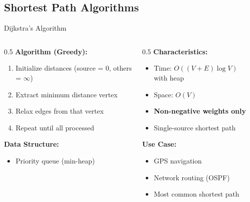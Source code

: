 \documentclass[aspectratio=169,xcolor=dvipsnames]{beamer}
\begin{document}
\subsection{Shortest Path Algorithms}

\begin{frame}{Dijkstra's Algorithm}
  \begin{columns}
    \begin{column}{0.5\textwidth}
      \textbf{Algorithm (Greedy):}
      \begin{enumerate}
        \item Initialize distances (source = 0, others = $\infty$)
        \item Extract minimum distance vertex
        \item Relax edges from that vertex
        \item Repeat until all processed
      \end{enumerate}

      \vspace{0.3cm}
      \textbf{Data Structure:}
      \begin{itemize}
        \item Priority queue (min-heap)
      \end{itemize}
    \end{column}

    \begin{column}{0.5\textwidth}
      \textbf{Characteristics:}
      \begin{itemize}
        \item Time: $O((V + E) \log V)$ with heap
        \item Space: $O(V)$
        \item \textbf{Non-negative weights only}
        \item Single-source shortest path
      \end{itemize}

      \vspace{0.3cm}
      \textbf{Use Case:}
      \begin{itemize}
        \item GPS navigation
        \item Network routing (OSPF)
        \item Most common shortest path
      \end{itemize}
    \end{column}
  \end{columns}
\end{frame}
\end{document}
